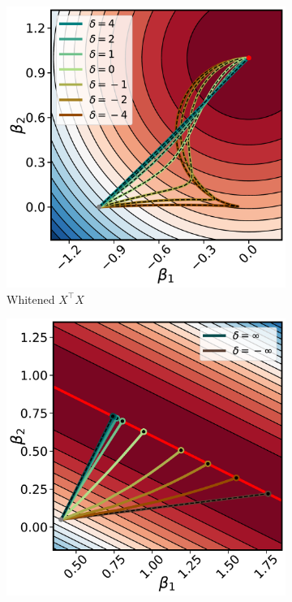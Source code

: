 \documentclass{article}
\theoremstyle{plain}
\theoremstyle{definition}
\theoremstyle{remark}
\begin{document}
\begin{figure}
    \vspace{-15pt}
    \begin{subfigure}{0.49\linewidth}
        \centering
        \includegraphics[width=\linewidth]{fig/single-neuron/function-space-whitened.pdf}
        \caption{Whitened $X^\intercal X$}
    \end{subfigure}
    \begin{subfigure}{0.49\linewidth}
        \centering
        \includegraphics[width=\linewidth]{fig/single-neuron/function-space-low-rank.pdf}

\end{subfigure}
\end{figure}
\end{document}
